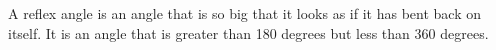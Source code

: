 A reflex angle is an angle that is so big that it looks as if it has bent back on itself.
It is an angle that is greater than 180 degrees but less than 360 degrees.